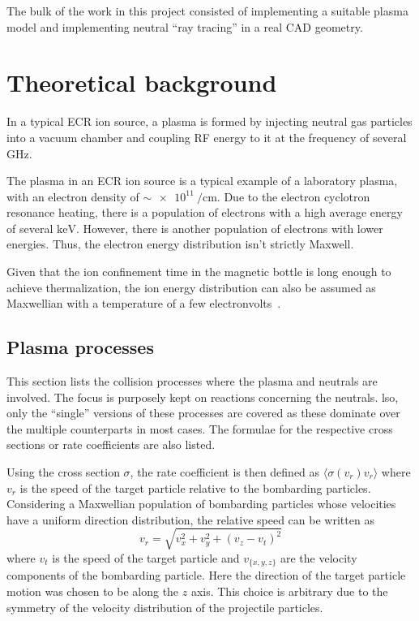 \documentclass[a4paper,twoside,12pt]{article}
\begin{document}
The bulk of the work in this project consisted of implementing a suitable plasma model and implementing neutral ``ray tracing'' in a real CAD geometry.

\section{Theoretical background}
In a typical ECR ion source, a plasma is formed by injecting neutral gas particles into a vacuum chamber and coupling RF energy to it at the frequency of several $\si{\giga\hertz}$.

The plasma in an ECR ion source is a typical example of a laboratory plasma, with an electron density of $\sim\SI{e11}{\per\centi\metre}$. Due to the electron cyclotron resonance heating, there is a population of electrons with a high average energy of several $\si{\kilo\electronvolt}$. However, there is another population of electrons with lower energies. Thus, the electron energy distribution isn't strictly Maxwell.~\cite{geller:ecr}

Given that the ion confinement time in the magnetic bottle is long enough to achieve thermalization, the ion energy distribution can also be assumed as Maxwellian with a temperature of a few electronvolts~\cite{geller:ecr}.

\subsection{Plasma processes}
This section lists the collision processes where the plasma and neutrals are involved. The focus is purposely kept on reactions concerning the neutrals. lso, only the ``single'' versions of these processes are covered as these dominate over the multiple counterparts in most cases. The formulae for the respective cross sections or rate coefficients are also listed.

Using the cross section $\sigma$, the rate coefficient is then defined as $\langle \sigma(v_r) v_r \rangle$ where $v_r$ is the speed of the target particle relative to the bombarding particles. Considering a Maxwellian population of bombarding particles whose velocities have a uniform direction distribution, the relative speed can be written as
\begin{equation}
    v_r = \sqrt{v_x^2 + v_y^2 + (v_z - v_t)^2}
\end{equation}
where $v_t$ is the speed of the target particle and $v_{\{x, y, z\}}$ are the velocity components of the bombarding particle. Here the direction of the target particle motion was chosen to be along the $z$ axis. This choice is arbitrary due to the symmetry of the velocity distribution of the projectile particles.
\end{document}
